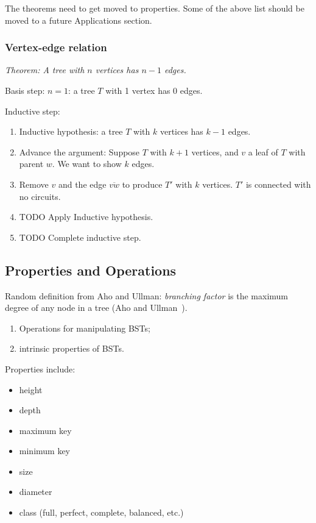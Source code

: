 \documentclass{article}
\begin{document}
The theorems need to get moved to properties. Some of the above list should be
moved to a future Applications section.

\subsubsection{Vertex-edge relation}

\textit{Theorem: A tree with $n$ vertices has $n-1$ edges.}

Basis step: $n = 1$: a tree $T$ with 1 vertex has 0 edges.

Inductive step:

\begin{enumerate}
  \item Inductive hypothesis: a tree $T$ with $k$ vertices has $k-1$
    edges.

  \item Advance the argument: Suppose $T$ with $k+1$ vertices, and $v$ a
    leaf of $T$ with parent $w$. We want to show $k$ edges.

  \item Remove $v$ and the edge $\overline{vw}$ to produce $T'$ with $k$
    vertices. $T'$ is connected with no circuits.
  \item TODO Apply Inductive hypothesis.
  \item TODO Complete inductive step.
\end{enumerate}

\subsection{Properties and Operations}

Random definition from Aho and Ullman: \textit{branching factor}
is the maximum degree of any node in a tree (Aho and Ullman~\cite[exercise on
p. 259]{aho:av:1992}).

\begin{enumerate}
\item Operations for manipulating BSTs;
\item intrinsic properties of BSTs.
\end{enumerate}

Properties include:

\begin{itemize}
\item height
\item depth
\item maximum key
\item minimum key
\item size
\item diameter
\item class (full, perfect, complete, balanced, etc.)
\end{itemize}
\end{document}
